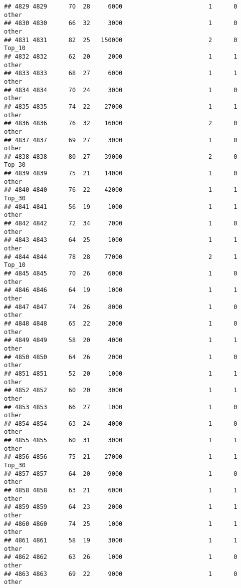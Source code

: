 \documentclass[
]{article}
\begin{document}
\begin{verbatim}
## 4829 4829      70  28     6000                        1      0    other
## 4830 4830      66  32     3000                        1      0    other
## 4831 4831      82  25   150000                        2      0   Top_10
## 4832 4832      62  20     2000                        1      1    other
## 4833 4833      68  27     6000                        1      1    other
## 4834 4834      70  24     3000                        1      0    other
## 4835 4835      74  22    27000                        1      1    other
## 4836 4836      76  32    16000                        2      0    other
## 4837 4837      69  27     3000                        1      0    other
## 4838 4838      80  27    39000                        2      0   Top_30
## 4839 4839      75  21    14000                        1      0    other
## 4840 4840      76  22    42000                        1      1   Top_30
## 4841 4841      56  19     1000                        1      1    other
## 4842 4842      72  34     7000                        1      0    other
## 4843 4843      64  25     1000                        1      1    other
## 4844 4844      78  28    77000                        2      1   Top_10
## 4845 4845      70  26     6000                        1      0    other
## 4846 4846      64  19     1000                        1      1    other
## 4847 4847      74  26     8000                        1      0    other
## 4848 4848      65  22     2000                        1      0    other
## 4849 4849      58  20     4000                        1      1    other
## 4850 4850      64  26     2000                        1      0    other
## 4851 4851      52  20     1000                        1      1    other
## 4852 4852      60  20     3000                        1      1    other
## 4853 4853      66  27     1000                        1      0    other
## 4854 4854      63  24     4000                        1      0    other
## 4855 4855      60  31     3000                        1      1    other
## 4856 4856      75  21    27000                        1      1   Top_30
## 4857 4857      64  20     9000                        1      0    other
## 4858 4858      63  21     6000                        1      1    other
## 4859 4859      64  23     2000                        1      1    other
## 4860 4860      74  25     1000                        1      1    other
## 4861 4861      58  19     3000                        1      1    other
## 4862 4862      63  26     1000                        1      0    other
## 4863 4863      69  22     9000                        1      0    other

\end{verbatim}
\end{document}
